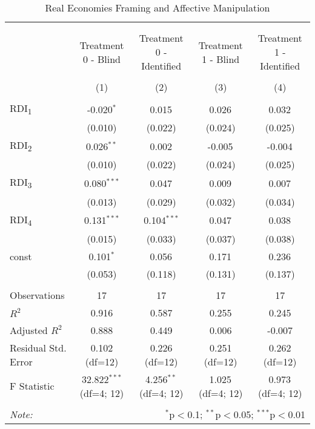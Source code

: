 \begin{table}[!htbp]
\centering
\caption{Real Economies Framing and Affective Manipulation}

\begin{tabular}{@{\extracolsep{5pt}}lcccc}
\\[-1.8ex]\hline
\hline \\[-1.8ex]
\\[-1.8ex] & \multicolumn{1}{c}{Treatment 0 - Blind} & \multicolumn{1}{c}{Treatment 0 - Identified} & \multicolumn{1}{c}{Treatment 1 - Blind} & \multicolumn{1}{c}{Treatment 1 - Identified}  \\
\\[-1.8ex] & (1) & (2) & (3) & (4) \\
\hline \\[-1.8ex]
 RDI\textsubscript{1} & -0.020$^{*}$ & 0.015$^{}$ & 0.026$^{}$ & 0.032$^{}$ \\
& (0.010) & (0.022) & (0.024) & (0.025) \\
 RDI\textsubscript{2} & 0.026$^{**}$ & 0.002$^{}$ & -0.005$^{}$ & -0.004$^{}$ \\
& (0.010) & (0.022) & (0.024) & (0.025) \\
 RDI\textsubscript{3} & 0.080$^{***}$ & 0.047$^{}$ & 0.009$^{}$ & 0.007$^{}$ \\
& (0.013) & (0.029) & (0.032) & (0.034) \\
 RDI\textsubscript{4} & 0.131$^{***}$ & 0.104$^{***}$ & 0.047$^{}$ & 0.038$^{}$ \\
& (0.015) & (0.033) & (0.037) & (0.038) \\
 const & 0.101$^{*}$ & 0.056$^{}$ & 0.171$^{}$ & 0.236$^{}$ \\
& (0.053) & (0.118) & (0.131) & (0.137) \\
\hline \\[-1.8ex]
 Observations & 17 & 17 & 17 & 17 \\
 $R^2$ & 0.916 & 0.587 & 0.255 & 0.245 \\
 Adjusted $R^2$ & 0.888 & 0.449 & 0.006 & -0.007 \\
 Residual Std. Error & 0.102 (df=12) & 0.226 (df=12) & 0.251 (df=12) & 0.262 (df=12) \\
 F Statistic & 32.822$^{***}$ (df=4; 12) & 4.256$^{**}$ (df=4; 12) & 1.025$^{}$ (df=4; 12) & 0.973$^{}$ (df=4; 12) \\
\hline
\hline \\[-1.8ex]
\textit{Note:} & \multicolumn{4}{r}{$^{*}$p$<$0.1; $^{**}$p$<$0.05; $^{***}$p$<$0.01} \\
\end{tabular}
\end{table}